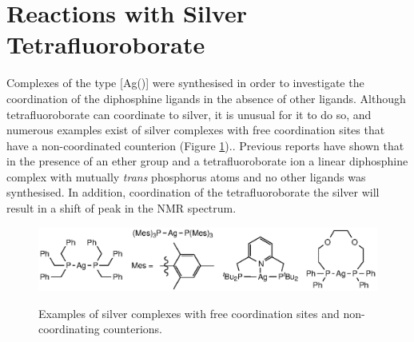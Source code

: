 
\section{Reactions with Silver Tetrafluoroborate}

Complexes of the type [Ag(\tBuxantphos)] were synthesised in order to investigate the coordination of the diphosphine ligands in the absence of other ligands.  Although tetrafluoroborate can coordinate to silver, it is unusual for it to do so, and numerous examples exist of silver complexes with free coordination sites that have a non-coordinated  counterion (Figure \ref{Linearsilver}).\cite{Ainscough2011, Bayler1996, Vlugt2009b}.  Previous reports have shown that in the presence of an ether group and a tetrafluoroborate ion a linear diphosphine complex with mutually \emph{trans} phosphorus atoms and no other ligands was synthesised.\cite{Heuer2000}  In addition, coordination of the tetrafluoroborate the silver will result in a shift of peak in the \fluorine{} NMR spectrum.

\begin{figure}[htbp]
\begin{center}
\vspace{0.5cm}
\includegraphics{../Figures/Linearsilvercomplexes.eps}
\caption[Silver complexes with free coordination sites and  counterions]{Examples of silver complexes with free coordination sites and non-coordinating  counterions.\cite{Ainscough2011, Bayler1996, Vlugt2009b}}
\vspace{0.2cm}
\label{Linearsilver}
\vspace{0.2cm}
\end{center}
\end{figure}
\vspace{0.2cm}


